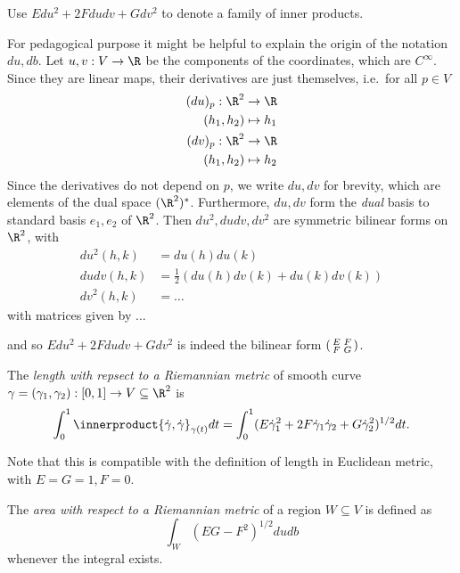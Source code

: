 \documentclass[a4paper]{article}
\theoremstyle{definition}
\newcommand*{\inner}{\innerproduct}
\begin{document}
\begin{notation}
  Use \(E du^2 + 2F dudv + G dv^2\) to denote a family of inner products.

  For pedagogical purpose it might be helpful to explain the origin of the notation \(du, db\). Let \(u, v: V \to \R\) be the components of the coordinates, which are \(C^\infty\). Since they are linear maps, their derivatives are just themselves, i.e.\ for all \(p \in V\)
  \begin{align*}
    (du)_p: \R^2 &\to \R \\
    (h_1, h_2) &\mapsto h_1 \\
    (dv)_p: \R^2 &\to \R \\
    (h_1, h_2) &\mapsto h_2
  \end{align*}
  Since the derivatives do not depend on \(p\), we write \(du, dv\) for brevity, which are elements of the dual space \((\R^2)^*\). Furthermore, \(du, dv\) form the \emph{dual} basis to standard basis \(e_1, e_2\) of \(\R^2\). Then \(du^2, dudv, dv^2\) are symmetric bilinear forms on \(\R^2\), with
  \begin{align*}
    du^2(h, k) &= du(h) du(k) \\
    dudv(h, k) &= \frac{1}{2}(du(h)dv(k) + du(k)dv(k)) \\
    dv^2(h, k) &= \dots
  \end{align*}
  with matrices given by ...

  and so \(Edu^2 + 2Fdudv + Gdv^2\) is indeed the bilinear form \(\begin{psmallmatrix} E & F \\ F & G \end{psmallmatrix}\).
\end{notation}

\begin{definition}[Length]
  The \emph{length with repsect to a Riemannian metric} of smooth curve \(\gamma = (\gamma_1, \gamma_2): [0, 1] \to V \subseteq \R^2\) is
  \[
    \int_0^1 \inner{\dot \gamma, \dot \gamma}_{\gamma(t)}dt = \int_0^1 (E \dot \gamma_1^2 + 2F \dot \gamma_1 \dot \gamma_2 + G \dot \gamma_2^2)^{1/2} dt.
  \]
\end{definition}

Note that this is compatible with the definition of length in Euclidean metric, with \(E = G = 1, F = 0\).

\begin{definition}
  The \emph{area with respect to a Riemannian metric} of a region \(W \subseteq V\) is defined as
  \[
    \int_W (EG - F^2)^{1/2} dudb
  \]
  whenever the integral exists.
\end{definition}
\end{document}
